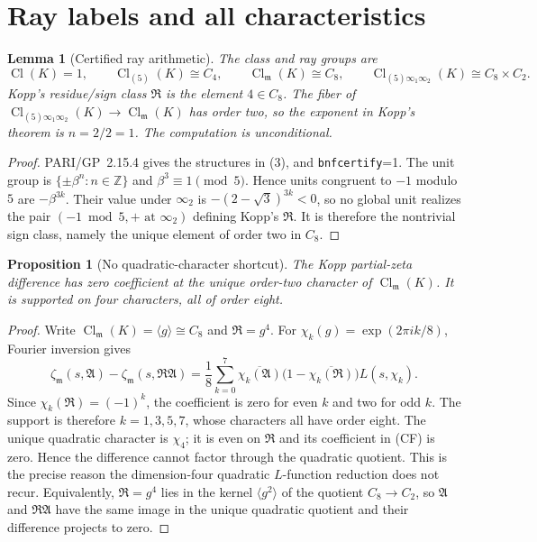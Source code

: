 \documentclass[11pt]{article}
\newtheorem{proposition}[theorem]{Proposition}
\newtheorem{lemma}[theorem]{Lemma}
\newcommand{\Cl}{\operatorname{Cl}}
\newcommand{\Z}{\mathbb Z}
\begin{document}
\section{Ray labels and all characteristics}

\begin{lemma}[Certified ray arithmetic]\label{lem:ray}
The class and ray groups are
\[
 \Cl(K)=1,\qquad
 \Cl_{(5)}(K)\cong C_4,\qquad
 \Cl_{\mathfrak m}(K)\cong C_8,\qquad
 \Cl_{(5)\infty_1\infty_2}(K)\cong C_8\times C_2.
\tag{3}
\]
Kopp's residue/sign class $\mathfrak R$ is the element $4\in C_8$.
The fiber of
$\Cl_{(5)\infty_1\infty_2}(K)\to\Cl_{\mathfrak m}(K)$ has order two,
so the exponent in Kopp's theorem is $n=2/2=1$.
The computation is unconditional.
\end{lemma}

\begin{proof}
PARI/GP~2.15.4 gives the structures in (3), and
\texttt{bnfcertify}=1.  The unit group is
$\{\pm\beta^n:n\in\Z\}$ and $\beta^3\equiv1\pmod5$.
Hence units congruent to $-1$ modulo $5$ are
$-\beta^{3k}$.  Their value under $\infty_2$ is
$-(2-\sqrt3)^{3k}<0$, so no global unit realizes the pair
$(-1\bmod5,+\text{ at }\infty_2)$ defining Kopp's $\mathfrak R$.
It is therefore the nontrivial sign class, namely the unique element
of order two in $C_8$.
\end{proof}

\begin{proposition}[No quadratic-character shortcut]\label{prop:noquadratic}
The Kopp partial-zeta difference has zero coefficient at the unique
order-two character of $\Cl_{\mathfrak m}(K)$.  It is supported on four
characters, all of order eight.
\end{proposition}

\begin{proof}
Write $\Cl_{\mathfrak m}(K)=\langle g\rangle\cong C_8$ and
$\mathfrak R=g^4$.  For
$\chi_k(g)=\exp(2\pi i k/8)$, Fourier inversion gives
\[
\zeta_{\mathfrak m}(s,\mathfrak A)
-\zeta_{\mathfrak m}(s,\mathfrak R\mathfrak A)
=\frac18\sum_{k=0}^7
\overline{\chi_k(\mathfrak A)}
\bigl(1-\overline{\chi_k(\mathfrak R)}\bigr)L(s,\chi_k).
\tag{CF}
\]
Since $\chi_k(\mathfrak R)=(-1)^k$, the coefficient is zero for even
$k$ and two for odd $k$.  The support is therefore
$k=1,3,5,7$, whose characters all have order eight.  The unique
quadratic character is $\chi_4$; it is even on $\mathfrak R$ and its
coefficient in \textup{(CF)} is zero.  Hence the difference cannot
factor through the quadratic quotient.  This is the precise reason
the dimension-four quadratic $L$-function reduction does not recur.
Equivalently, $\mathfrak R=g^4$ lies in the kernel
$\langle g^2\rangle$ of the quotient $C_8\to C_2$, so
$\mathfrak A$ and $\mathfrak R\mathfrak A$ have the same image in the
unique quadratic quotient and their difference projects to zero.
\end{proof}
\end{document}
